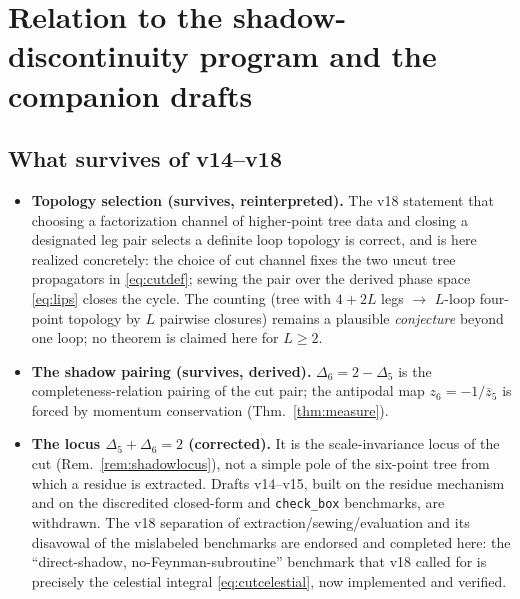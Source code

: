 \documentclass[12pt,a4paper]{article}
\theoremstyle{plain}
\theoremstyle{definition}
\theoremstyle{remark}
\begin{document}
\section{Relation to the shadow-discontinuity program and the
companion drafts}
\label{sec:relation}

\subsection{What survives of v14--v18}
\begin{itemize}
\item \textbf{Topology selection (survives, reinterpreted).}  The v18
statement that choosing a factorization channel of higher-point tree
data and closing a designated leg pair selects a definite loop topology
is correct, and is here realized concretely: the choice of cut channel
fixes the two uncut tree propagators in \eqref{eq:cutdef}; sewing the
pair over the derived phase space \eqref{eq:lips} closes the cycle.
The counting (tree with $4+2L$ legs $\to$ $L$-loop four-point topology
by $L$ pairwise closures) remains a plausible \emph{conjecture} beyond
one loop; no theorem is claimed here for $L\ge2$.
\item \textbf{The shadow pairing (survives, derived).}
$\Delta_6=2-\Delta_5$ is the completeness-relation pairing of the cut
pair; the antipodal map $z_6=-1/\bar z_5$ is forced by momentum
conservation (Thm.~\ref{thm:measure}).
\item \textbf{The locus $\Delta_5+\Delta_6=2$ (corrected).}  It is the
scale-invariance locus of the cut (Rem.~\ref{rem:shadowlocus}), not a
simple pole of the six-point tree from which a residue is extracted.
Drafts v14--v15, built on the residue mechanism and on the discredited
closed-form and \texttt{check\_box} benchmarks, are withdrawn.  The v18
separation of extraction/sewing/evaluation and its disavowal of the
mislabeled benchmarks are endorsed and completed here: the
``direct-shadow, no-Feynman-subroutine'' benchmark that v18 called for
is precisely the celestial integral \eqref{eq:cutcelestial}, now
implemented and verified.
\end{itemize}
\end{document}
